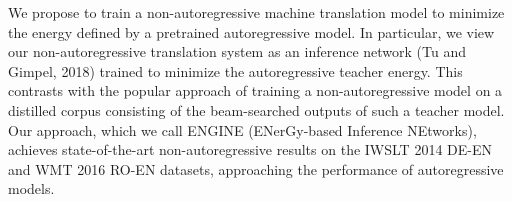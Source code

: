 We propose to train a non-autoregressive machine translation model to minimize the energy defined by a pretrained autoregressive model. In particular, we view our non-autoregressive translation system as an inference network (Tu and Gimpel, 2018) trained to minimize the autoregressive teacher energy. This contrasts with the popular approach of training a non-autoregressive model on a distilled corpus consisting of the beam-searched outputs of such a teacher model. Our approach, which we call ENGINE (ENerGy-based Inference NEtworks), achieves state-of-the-art non-autoregressive results on the IWSLT 2014 DE-EN and WMT 2016 RO-EN datasets, approaching the performance of autoregressive models.
